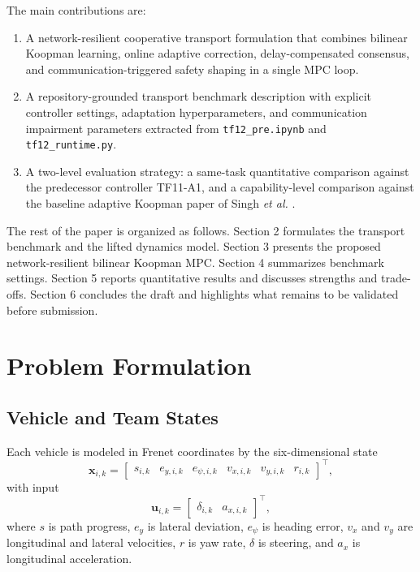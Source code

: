 \documentclass[twocolumn,3p,times,procedia]{elsarticle}
\newcommand{\tfone}{TF11-A1}
\begin{document}
The main contributions are:
\begin{enumerate}
    \item A network-resilient cooperative transport formulation that combines bilinear Koopman learning, online adaptive correction, delay-compensated consensus, and communication-triggered safety shaping in a single MPC loop.
    \item A repository-grounded transport benchmark description with explicit controller settings, adaptation hyperparameters, and communication impairment parameters extracted from \texttt{tf12\_pre.ipynb} and \texttt{tf12\_runtime.py}.
    \item A two-level evaluation strategy: a same-task quantitative comparison against the predecessor controller \tfone{}, and a capability-level comparison against the baseline adaptive Koopman paper of Singh \emph{et al.} \cite{singh2024adaptive}.
\end{enumerate}

The rest of the paper is organized as follows. Section 2 formulates the transport benchmark and the lifted dynamics model. Section 3 presents the proposed network-resilient bilinear Koopman MPC. Section 4 summarizes benchmark settings. Section 5 reports quantitative results and discusses strengths and trade-offs. Section 6 concludes the draft and highlights what remains to be validated before submission.

\section{Problem Formulation}
\subsection{Vehicle and Team States}
Each vehicle is modeled in Frenet coordinates by the six-dimensional state
\begin{equation}
\bm{x}_{i,k}=\begin{bmatrix}s_{i,k} & e_{y,i,k} & e_{\psi,i,k} & v_{x,i,k} & v_{y,i,k} & r_{i,k}\end{bmatrix}^{\top},
\end{equation}
with input
\begin{equation}
\bm{u}_{i,k}=\begin{bmatrix}\delta_{i,k} & a_{x,i,k}\end{bmatrix}^{\top},
\end{equation}
where $s$ is path progress, $e_y$ is lateral deviation, $e_{\psi}$ is heading error, $v_x$ and $v_y$ are longitudinal and lateral velocities, $r$ is yaw rate, $\delta$ is steering, and $a_x$ is longitudinal acceleration.
\end{document}
